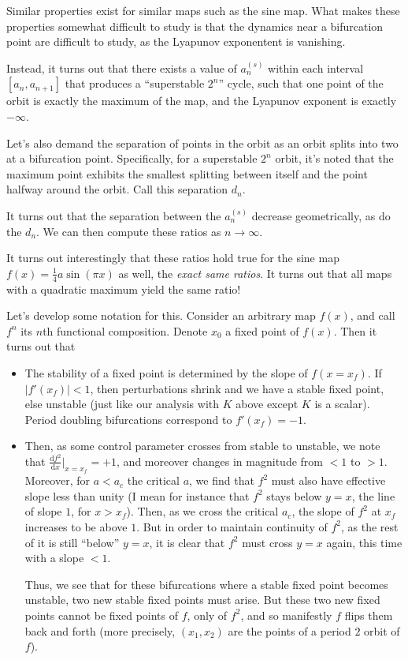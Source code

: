 \documentclass[10pt]{article}
\newcommand{\rd}[2]{\frac{\mathrm{d}#1}{\mathrm{d}#2}}
\newcommand{\abs}[1]{\left|#1\right|}
\begin{document}
Similar properties exist for similar maps such as the sine map. What makes these
properties somewhat difficult to study is that the dynamics near a bifurcation
point are difficult to study, as the Lyapunov exponentent is vanishing.

Instead, it turns out that there exists a value of $a_n^{(s)}$ within each
interval $[a_n, a_{n+1}]$ that produces a ``superstable $2^n$'' cycle, such
that one point of the orbit is exactly the maximum of the map, and the Lyapunov
exponent is exactly $-\infty$.

Let's also demand the separation of points in the orbit as an orbit splits into
two at a bifurcation point. Specifically, for a superstable $2^n$ orbit, it's
noted that the maximum point exhibits the smallest splitting between itself and
the point halfway around the orbit. Call this separation $d_n$.

It turns out that the separation between the $a_n^{(s)}$ decrease geometrically,
as do the $d_n$. We can then compute these ratios as $n \to \infty$.

It turns out interestingly that these ratios hold true for the sine map
$f(x) = \frac{1}{4}a \sin\left( \pi x \right)$ as well, the \emph{exact same
ratios}. It turns out that all maps with a quadratic maximum yield the same
ratio!

Let's develop some notation for this. Consider an arbitrary map $f(x)$, and call
$f^n$ its $n$th functional composition. Denote $x_0$ a fixed point of $f(x)$.
Then it turns out that
\begin{itemize}
    \item The stability of a fixed point is determined by the slope of
        $f(x=x_f)$. If $\abs{f'(x_f)} < 1$, then perturbations shrink and we
        have a stable fixed point, else unstable (just like our analysis with
        $K$ above except $K$ is a scalar). Period doubling bifurcations
        correspond to $f'(x_f) = -1$.
    \item Then, as some control parameter crosses from stable to unstable, we
        note that $\rd{f^2}{x}\Bigg|_{x=x_f} = +1$, and moreover changes in
        magnitude from $<1$ to $>1$. Moreover, for $a < a_c$ the critical $a$,
        we find that $f^2$ must also have effective slope less than unity
        (I mean for instance that $f^2$ stays below $y=x$, the line of slope
        $1$, for $x > x_f$). Then, as we cross the critical $a_c$, the slope of
        $f^2$ at $x_f$ increases to be above $1$. But in order to maintain
        continuity of $f^2$, as the rest of it is still ``below'' $y=x$, it is
        clear that $f^2$ must cross $y=x$ again, this time with a slope $<1$.


        Thus, we see that for these bifurcations where a stable fixed point
        becomes unstable, two new stable fixed points must arise. But these two
        new fixed points cannot be fixed points of $f$, only of $f^2$, and so
        manifestly $f$ flips them back and forth (more precisely, $(x_1, x_2)$
        are the points of a period $2$ orbit of $f$).
\end{itemize}
\end{document}
